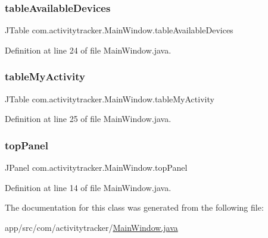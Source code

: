 \subsubsection{\texorpdfstring{table\+Available\+Devices}{tableAvailableDevices}}
{\footnotesize\ttfamily J\+Table com.\+activitytracker.\+Main\+Window.\+table\+Available\+Devices\hspace{0.3cm}{\ttfamily [private]}}



Definition at line 24 of file Main\+Window.\+java.

\mbox{\label{classcom_1_1activitytracker_1_1_main_window_a0ad6d3ca1298275eba15a9ea189d4d9b}} 
\subsubsection{\texorpdfstring{table\+My\+Activity}{tableMyActivity}}
{\footnotesize\ttfamily J\+Table com.\+activitytracker.\+Main\+Window.\+table\+My\+Activity\hspace{0.3cm}{\ttfamily [private]}}



Definition at line 25 of file Main\+Window.\+java.

\mbox{\label{classcom_1_1activitytracker_1_1_main_window_a6baf76b2b8ede1ba82fc6d096ddb580b}} 
\subsubsection{\texorpdfstring{top\+Panel}{topPanel}}
{\footnotesize\ttfamily J\+Panel com.\+activitytracker.\+Main\+Window.\+top\+Panel\hspace{0.3cm}{\ttfamily [private]}}



Definition at line 14 of file Main\+Window.\+java.



The documentation for this class was generated from the following file\+:\begin{DoxyCompactItemize}
\item 
app/src/com/activitytracker/\mbox{\hyperlink{_main_window_8java}{Main\+Window.\+java}}\end{DoxyCompactItemize}
